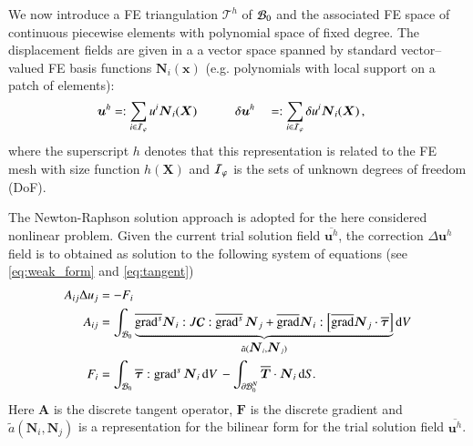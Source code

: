 \documentclass[preprint,12pt,times]{elsarticle}
\def\gz  #1{           \mbox{$\boldsymbol{#1}$}}
\def\grad {\mbox{grad}}
\def\d {\mbox{d}}
\def\mcl  #1{               {\cal #1}}
\begin{document}
We now introduce a FE triangulation $\mathcal{T}^h$ of $\mcl B_0$ and
the associated FE space of continuous piecewise elements with polynomial space of fixed degree. %
The displacement fields are given in a
a vector space spanned by standard vector--valued FE basis functions $\gz N_i(\gz x)$ (e.g. polynomials with local support on a patch of elements):
\begin{alignat}{2}
       \gz u^h &=:  \sum_{i \in \mcl I_\varphi} u^i \gz N_i (\gz X) \quad \quad \quad
\delta \gz u^h &&=: \sum_{i \in \mcl I_\varphi} \delta u^i \gz N_i (\gz X) \,,
\end{alignat}
where the superscript $h$ denotes that this representation is related to the FE mesh with size function $h(\gz X)$ and $\mcl I_\varphi$ is the sets of unknown degrees of freedom (DoF).

The Newton-Raphson solution approach is adopted for the here considered nonlinear problem.
Given the current trial solution field $\overline{\gz u^h}$, the correction $\Delta \gz u^h$ field is to obtained as solution to the following system of equations (see \eqref{eq:weak_form} and \eqref{eq:tangent})
\begin{align}
  A_{ij} \Delta u_j &= - F_i  \label{eq:linear_system} \\
  A_{ij} &=
  \int_{\mcl B_0}
  \underbrace{
  \overline{\grad^s} \gz N_i : J \boldsymbol{\mathcal{C}} : \overline{\grad^s} \, \gz N_j
  +
  \overline{\grad}\gz N_i :
  \left[
  \overline{\grad} \gz N_j \cdot
  \overline{\gz \tau}
  \right]
  }_{\tilde{a}(\gz N_i, \gz N_j)}
  \d V
  \label{eq:algebraic_tangent}
  \\
  F_i &=
  \int_{\mcl B_0} \overline{\gz \tau} : \grad^{s} \, \gz N_i \, \d V \,
  -
  \int_{\partial \mcl B_0^N} \overline{\gz T} \cdot \gz N_i \, \d S.
\end{align}
Here $\gz A$ is the discrete tangent operator, $\gz F$ is the discrete gradient
and $\tilde{a}(\gz N_i, \gz N_j)$ is a representation for the bilinear form for the trial solution field $\overline{\gz u^h}$.
\end{document}
